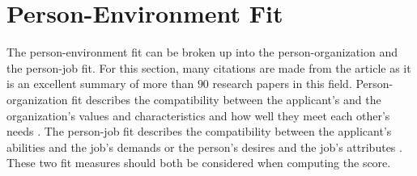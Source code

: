 \documentclass[draft,final]{thesisclass} %
\begin{document}
\section{Person-Environment Fit}
The person-environment fit can be broken up into the person-organization and the person-job fit.
For this section, many citations are made from the article \textcite{po_and_pj_fit_literature_review} as it is an excellent summary of more than $90$ research papers in this field.
Person-organization fit describes the compatibility between the applicant's and the organization's values and characteristics and how well they meet each other's needs \parencite[179]{po_and_pj_fit_literature_review}.
The person-job fit describes the compatibility between the applicant's abilities and the job's demands or the person's desires and the job's attributes \parencite[179]{po_and_pj_fit_literature_review}.
These two fit measures should both be considered when computing the score.
\end{document}
